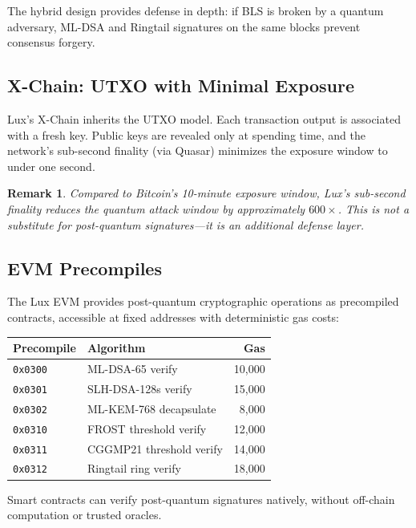 \documentclass[11pt,a4paper]{article}
\newtheorem{remark}{Remark}[section]
\begin{document}
The hybrid design provides defense in depth: if BLS is broken by a
quantum adversary, ML-DSA and Ringtail signatures on the same blocks
prevent consensus forgery.

\subsection{X-Chain: UTXO with Minimal Exposure}

Lux's X-Chain inherits the UTXO model. Each transaction output is
associated with a fresh key. Public keys are revealed only at spending
time, and the network's sub-second finality (via Quasar) minimizes
the exposure window to under one second.

\begin{remark}
Compared to Bitcoin's 10-minute exposure window, Lux's sub-second
finality reduces the quantum attack window by approximately
$600\times$. This is not a substitute for post-quantum signatures---it
is an additional defense layer.
\end{remark}

\subsection{EVM Precompiles}

The Lux EVM provides post-quantum cryptographic operations as
precompiled contracts, accessible at fixed addresses with deterministic
gas costs:

\begin{center}
\begin{tabular}{llr}
\toprule
\textbf{Precompile} & \textbf{Algorithm} & \textbf{Gas} \\
\midrule
\texttt{0x0300} & ML-DSA-65 verify & 10,000 \\
\texttt{0x0301} & SLH-DSA-128s verify & 15,000 \\
\texttt{0x0302} & ML-KEM-768 decapsulate & 8,000 \\
\texttt{0x0310} & FROST threshold verify & 12,000 \\
\texttt{0x0311} & CGGMP21 threshold verify & 14,000 \\
\texttt{0x0312} & Ringtail ring verify & 18,000 \\
\bottomrule
\end{tabular}
\end{center}

Smart contracts can verify post-quantum signatures natively, without
off-chain computation or trusted oracles.
\end{document}
